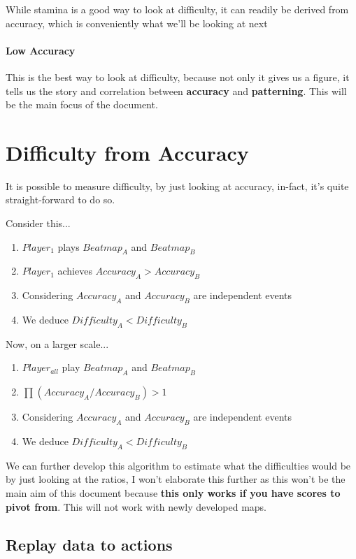 \documentclass{article}
\begin{document}
While stamina is a good way to look at difficulty, it can readily be derived from accuracy, which is conveniently what we'll be looking at next

\paragraph{Low Accuracy}

This is the best way to look at difficulty, because not only it gives us a figure, it tells us the story and correlation between \textbf{accuracy} and \textbf{patterning}. This will be the main focus of the document.

\section{Difficulty from Accuracy}

It is possible to measure difficulty, by just looking at accuracy, in-fact, it's quite straight-forward to do so.

Consider this...
\begin{enumerate}
	\item $Player_1$ plays $Beatmap_A$ and $Beatmap_B$
	\item $Player_1$ achieves $Accuracy_A > Accuracy_B$
	\item Considering $Accuracy_A$ and $Accuracy_B$ are independent events
	\item We deduce $Difficulty_A < Difficulty_B$
\end{enumerate}

Now, on a larger scale...
\begin{enumerate}
	\item $Player_{all}$ play $Beatmap_A$ and $Beatmap_B$
	\item $\prod_{} (Accuracy_A / Accuracy_B) > 1$
	\item Considering $Accuracy_A$ and $Accuracy_B$ are independent events
	\item We deduce $Difficulty_A < Difficulty_B$
\end{enumerate}

We can further develop this algorithm to estimate what the difficulties would be by just looking at the ratios, I won't elaborate this further as this won't be the main aim of this document because \textbf{this only works if you have scores to pivot from}. This will not work with newly developed maps.

\subsection{Replay data to actions}
\end{document}
